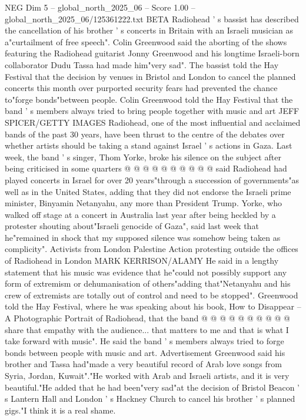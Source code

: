 \begin{textsample}{NEG Dim 5 – global\_north\_2025\_06 – Score 1.00 – global\_north\_2025\_06/125361222.txt}  \label{ex:f5_neg_384}
BETA Radiohead ' s bassist has described the cancellation of his brother ' s concerts in Britain with an Israeli musician as a"curtailment of free speech".
Colin Greenwood said the aborting of the shows featuring the Radiohead guitarist Jonny Greenwood and his longtime Israeli-born collaborator Dudu Tassa had made him"very sad".
The bassist told the Hay Festival that the decision by venues in Bristol and London to cancel the planned concerts this month over purported security fears had prevented the chance to"forge bonds"between people.
Colin Greenwood told the Hay Festival that the band ' s members always tried to bring people together with music and art JEFF SPICER/GETTY IMAGES Radiohead, one of the most influential and acclaimed bands of the past 30 years, have been thrust to the centre of the debates over whether artists should be taking a stand against Israel ' s actions in Gaza.
Last week, the band ' s singer, Thom Yorke, broke his silence on the subject after being criticised in some quarters @ @ @ @ @ @ @ @ @ @ said Radiohead had played concerts in Israel for over 20 years"through a succession of governments"as well as in the United States, adding that they did not endorse the Israeli prime minister, Binyamin Netanyahu, any more than President Trump.
Yorke, who walked off stage at a concert in Australia last year after being heckled by a protester shouting about"Israeli genocide of Gaza", said last week that he"remained in shock that my supposed silence was somehow being taken as complicity".
Activists from London Palestine Action protesting outside the offices of Radiohead in London MARK KERRISON/ALAMY He said in a lengthy statement that his music was evidence that he"could not possibly support any form of extremism or dehumanisation of others"adding that"Netanyahu and his crew of extremists are totally out of control and need to be stopped".
Greenwood told the Hay Festival, where he was speaking about his book, How to Disappear -- A Photographic Portrait of Radiohead, that the band @ @ @ @ @ @ @ @ @ @ share that empathy with the audience... that matters to me and that is what I take forward with music".
He said the band ' s members always tried to forge bonds between people with music and art.
Advertisement Greenwood said his brother and Tassa had"made a very beautiful record of Arab love songs from Syria, Jordan, Kuwait"."He worked with Arab and Israeli artists, and it is very beautiful."He added that he had been"very sad"at the decision of Bristol Beacon ' s Lantern Hall and London ' s Hackney Church to cancel his brother ' s planned gigs."I think it is a real shame.

\end{textsample}

